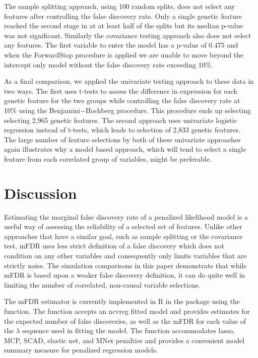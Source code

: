 The sample splitting approach, using 100 random splits, does not select any features after controlling the false discovery rate. Only a single genetic feature reached the second stage in at at least half of the splits but its median p-value was not significant. Similarly the covariance testing approach also does not select any features.  The first variable to enter the model has a p-value of 0.475 and when the ForwardStop procedure is applied we are unable to move beyond the intercept only model without the false discovery rate exceeding 10\%.

As a final comparison, we applied the univariate testing approach to these data in two ways. The first uses t-tests to assess the difference in expression for each genetic feature for the two groups while controlling the false discovery rate at 10\% using the Benjamini$-$Hochberg procedure.  This procedure ends up selecting selecting 2,965 genetic features. The second approach uses univariate logistic regression instead of t-tests, which leads to selection of 2,833 genetic features. The large number of feature selections by both of these univariate approaches again illustrates why a model based approach, which will tend to select a single feature from each correlated group of variables, might be preferable. 

\section{Discussion}
Estimating the marginal false discovery rate of a penalized likelihood model is a useful way of assessing the reliability of a selected set of features. Unlike other approaches that have a similar goal, such as sample splitting or the covariance test, mFDR uses less strict definition of a false discovery which does not condition on any other variables and consequently only limits variables that are strictly noise. The simulation comparisons in this paper demonstrate that while mFDR is based upon a weaker false discovery definition, it can do quite well in limiting the number of correlated, non-causal variable selections.

The mFDR estimator is currently implemented in R in the  package \citep{Breheny2011} using the  function. The function accepts an ncvreg fitted model  and provides estimates for the expected number of false discoveries, as well as the mFDR for each value of the $\lambda$ sequence used in fitting the model. The function accommodates lasso, MCP, SCAD, elastic net, and MNet \citep{Huang2016} penalties and provides a convenient model summary measure for penalized regression models.

